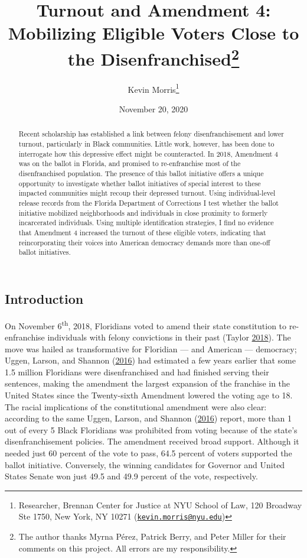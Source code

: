 \documentclass[
  12pt,
]{article}
\title{Turnout and Amendment 4: Mobilizing Eligible Voters Close to the Disenfranchised\thanks{The author thanks Myrna Pérez, Patrick Berry, and Peter Miller for their comments on this project. All errors are my responsibility.}}
\author{Kevin Morris\footnote{Researcher, Brennan Center for Justice at NYU School of Law, 120 Broadway Ste 1750, New York, NY 10271 (\href{mailto:kevin.morris@nyu.edu}{\nolinkurl{kevin.morris@nyu.edu}})}}
\date{November 20, 2020}
\begin{document}
\maketitle
\begin{abstract}
Recent scholarship has established a link between felony disenfranchisement and lower turnout, particularly in Black communities. Little work, however, has been done to interrogate how this depressive effect might be counteracted. In 2018, Amendment 4 was on the ballot in Florida, and promised to re-enfranchise most of the disenfranchised population. The presence of this ballot initiative offers a unique opportunity to investigate whether ballot initiatives of special interest to these impacted communities might recoup their depressed turnout. Using individual-level release records from the Florida Department of Corrections I test whether the ballot initiative mobilized neighborhoods and individuals in close proximity to formerly incarcerated individuals. Using multiple identification strategies, I find no evidence that Amendment 4 increased the turnout of these eligible voters, indicating that reincorporating their voices into American democracy demands more than one-off ballot initiatives.
\end{abstract}

\pagebreak

\doublespacing

\hypertarget{introduction}{%
\subsection*{Introduction}\label{introduction}}

On November 6\textsuperscript{th}, 2018, Floridians voted to amend their state constitution to re-enfranchise individuals with felony convictions in their past (Taylor \protect\hyperlink{ref-Taylor2018}{2018}). The move was hailed as transformative for Floridian --- and American --- democracy; Uggen, Larson, and Shannon (\protect\hyperlink{ref-sentencing_2016}{2016}) had estimated a few years earlier that some 1.5 million Floridians were disenfranchised and had finished serving their sentences, making the amendment the largest expansion of the franchise in the United States since the Twenty-sixth Amendment lowered the voting age to 18. The racial implications of the constitutional amendment were also clear: according to the same Uggen, Larson, and Shannon (\protect\hyperlink{ref-sentencing_2016}{2016}) report, more than 1 out of every 5 Black Floridians was prohibited from voting because of the state's disenfranchisement policies. The amendment received broad support. Although it needed just 60 percent of the vote to pass, 64.5 percent of voters supported the ballot initiative. Conversely, the winning candidates for Governor and United States Senate won just 49.5 and 49.9 percent of the vote, respectively.
\end{document}
